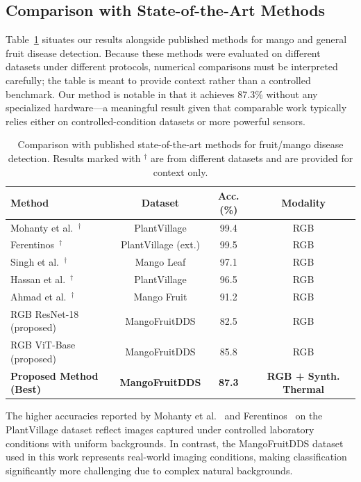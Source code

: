 \documentclass[utf8]{FrontiersinHarvard} %
\begin{document}
\subsection{Comparison with State-of-the-Art Methods}
Table~\ref{tab:sota} situates our results alongside published methods for mango and general fruit disease detection. Because these methods were evaluated on different datasets under different protocols, numerical comparisons must be interpreted carefully; the table is meant to provide context rather than a controlled benchmark. Our method is notable in that it achieves 87.3\% without any specialized hardware---a meaningful result given that comparable work typically relies either on controlled-condition datasets or more powerful sensors.

\begin{table}[!ht]
    \caption{Comparison with published state-of-the-art methods for fruit/mango disease detection. Results marked with $^{\dagger}$ are from different datasets and are provided for context only.}
    \label{tab:sota}
    \raggedright
    \scriptsize
    \begin{tabular}{lccc}
        \toprule
        \textbf{Method} & \textbf{Dataset} & \textbf{Acc. (\%)} & \textbf{Modality} \\
        \midrule
        Mohanty et al.~\cite{mohanty2016}$^{\dagger}$ & PlantVillage & 99.4 & RGB \\
        Ferentinos~\cite{ferentinos2018}$^{\dagger}$ & PlantVillage (ext.) & 99.5 & RGB \\
        Singh et al.~\cite{singh2019}$^{\dagger}$ & Mango Leaf & 97.1 & RGB \\
        Hassan et al.~\cite{hassan2021}$^{\dagger}$ & PlantVillage & 96.5 & RGB \\
        Ahmad et al.~\cite{ahmad2023}$^{\dagger}$ & Mango Fruit & 91.2 & RGB \\
        \midrule
        RGB ResNet-18 (proposed) & MangoFruitDDS & 82.5 & RGB \\
        RGB ViT-Base (proposed) & MangoFruitDDS & 85.8 & RGB \\
        \textbf{Proposed Method (Best)} & \textbf{MangoFruitDDS} & \textbf{87.3} & \textbf{RGB + Synth. Thermal} \\
        \bottomrule
    \end{tabular}
\end{table}

The higher accuracies reported by Mohanty et al.~\cite{mohanty2016} and Ferentinos~\cite{ferentinos2018} on the PlantVillage dataset reflect images captured under controlled laboratory conditions with uniform backgrounds. In contrast, the MangoFruitDDS dataset used in this work represents real-world imaging conditions, making classification significantly more challenging due to complex natural backgrounds.
\end{document}
